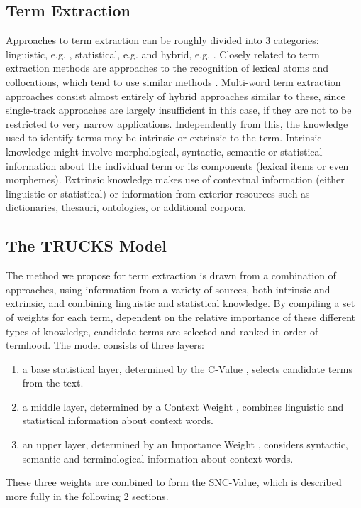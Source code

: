 \subsection{Term Extraction}
Approaches to term extraction can be roughly divided into 3
categories: linguistic, e.g. \cite{Ananiadou94,Bourigault92},
statistical, e.g. \cite{Smadja93,Lauriston96} and hybrid,
e.g. \cite{Dagan94,Justeson95,Frantzi99}. Closely related to term
extraction methods are approaches to the recognition of lexical atoms
and collocations, which tend to use similar methods
\cite{Evans96,Nakagawa98}. Multi-word term
extraction approaches consist almost entirely of hybrid approaches
similar to these, since single-track approaches are largely
insufficient in this case, if they are not
to be restricted to very narrow applications. Independently from this,
the knowledge used to identify terms may be intrinsic or extrinsic to
the term. Intrinsic knowledge might involve morphological,
syntactic, semantic or statistical information about the individual term
or its components (lexical items or even morphemes). Extrinsic
knowledge makes use of contextual information (either linguistic or
statistical) or information from exterior resources such as
dictionaries, thesauri, ontologies, or additional corpora.

\subsection{The TRUCKS Model}
The method we propose for term extraction is drawn from a combination
of approaches, using information from a variety of sources, both
intrinsic and extrinsic, and combining linguistic and statistical
knowledge. By compiling a set of weights for each term, dependent on
the relative importance of these different types of knowledge,
candidate terms are selected and ranked in order of termhood. The
model consists of three layers:
\begin{enumerate}
\item a base statistical layer, determined by the C-Value
\cite{Frantzi96b}, selects candidate terms from the text.
\item a middle layer, determined by a Context Weight \cite{Frantzi99},
combines linguistic and statistical information about context words.
\item an upper layer, determined by an Importance Weight \cite{Maynard99d},
considers syntactic, semantic and terminological information about
context words.
\end{enumerate}
These three weights are combined to form the SNC-Value, which is
described more fully in the following 2 sections.

